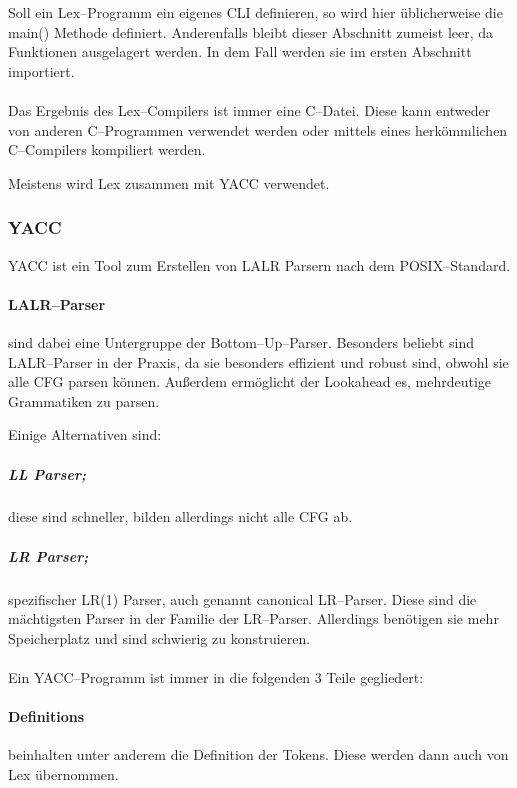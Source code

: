 Soll ein Lex--Programm ein eigenes \ac{CLI} definieren, so wird hier üblicherweise die {\ttfamily main()} Methode definiert.
Anderenfalls bleibt dieser Abschnitt zumeist leer, da Funktionen ausgelagert werden.
In dem Fall werden sie im ersten Abschnitt importiert.

\paragraph*{}
Das Ergebnis des Lex--Compilers ist immer eine C--Datei.
Diese kann entweder von anderen C--Programmen verwendet werden oder mittels eines herkömmlichen C--Compilers kompiliert werden.

Meistens wird Lex zusammen mit \ac{YACC} verwendet.

\subsubsection{\acs{YACC}}
\ac{YACC} ist ein Tool zum Erstellen von \ac{LALR} Parsern nach dem \acs{POSIX}--Standard.

\paragraph{\acs{LALR}--Parser} sind dabei eine Untergruppe der Bottom--Up--Parser.
Besonders beliebt sind \acs{LALR}--Parser in der Praxis, da sie besonders effizient und robust sind, obwohl sie alle \ac{CFG} parsen können.
Außerdem ermöglicht der Lookahead es, mehrdeutige Grammatiken zu parsen.

Einige Alternativen sind:

\subparagraph{\ac{LL} Parser;} diese sind schneller, bilden allerdings nicht alle \ac{CFG} ab.

\subparagraph{\ac{LR} Parser;} spezifischer LR(1) Parser, auch genannt canonical \acs{LR}--Parser.
Diese sind die mächtigsten Parser in der Familie der \acs{LR}--Parser.
Allerdings benötigen sie mehr Speicherplatz und sind schwierig zu konstruieren.

\paragraph*{}
Ein \acs{YACC}--Programm ist immer in die folgenden 3 Teile gegliedert:


\paragraph{Definitions} beinhalten unter anderem die Definition der Tokens.
Diese werden dann auch von Lex übernommen.

